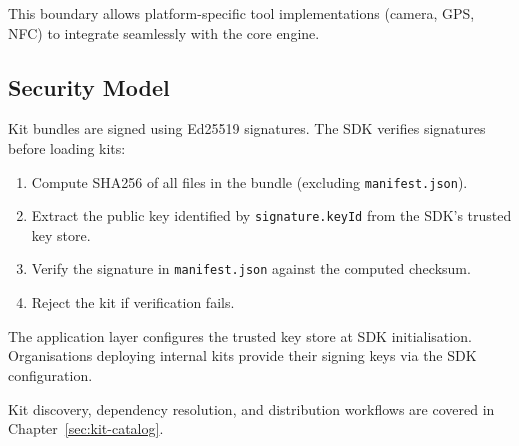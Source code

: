 This boundary allows platform-specific tool implementations (camera, GPS, NFC) to integrate seamlessly with the core engine.

\subsection{Security Model}

Kit bundles are signed using Ed25519 signatures. The SDK verifies signatures before loading kits:

\begin{enumerate}
  \item Compute SHA256 of all files in the bundle (excluding \texttt{manifest.json}).
  \item Extract the public key identified by \texttt{signature.keyId} from the SDK's trusted key store.
  \item Verify the signature in \texttt{manifest.json} against the computed checksum.
  \item Reject the kit if verification fails.
\end{enumerate}

The application layer configures the trusted key store at SDK initialisation. Organisations deploying internal kits provide their signing keys via the SDK configuration.

Kit discovery, dependency resolution, and distribution workflows are covered in Chapter~\ref{sec:kit-catalog}.
